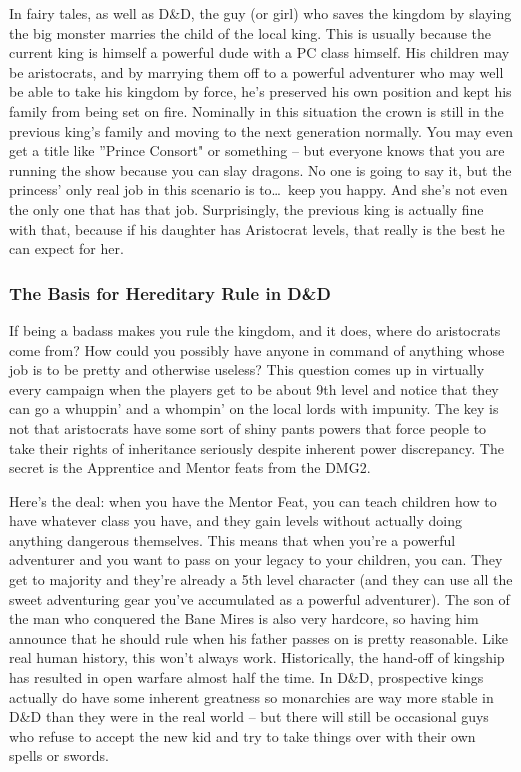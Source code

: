 In fairy tales, as well as D\&D, the guy (or girl) who saves the kingdom by slaying the big monster marries the child of the local king. This is usually because the current king is himself a powerful dude with a PC class himself. His children may be aristocrats, and by marrying them off to a powerful adventurer who may well be able to take his kingdom by force, he's preserved his own position and kept his family from being set on fire. Nominally in this situation the crown is still in the previous king's family and moving to the next generation normally. You may even get a title like ''Prince Consort" or something -- but everyone knows that you are running the show because you can slay dragons. No one is going to say it, but the princess' only real job in this scenario is to\ldots\  keep you happy. And she's not even the only one that has that job. Surprisingly, the previous king is actually fine with that, because if his daughter has Aristocrat levels, that really is the best he can expect for her.

\subsubsection{The Basis for Hereditary Rule in D\&D}
\vspace*{-8pt}

If being a badass makes you rule the kingdom, and it does, where do aristocrats come from? How could you possibly have anyone in command of anything whose job is to be pretty and otherwise useless? This question comes up in virtually every campaign when the players get to be about 9th level and notice that they can go a whuppin' and a whompin' on the local lords with impunity. The key is not that aristocrats have some sort of shiny pants powers that force people to take their rights of inheritance seriously despite inherent power discrepancy. The secret is the Apprentice and Mentor feats from the DMG2.

Here's the deal: when you have the Mentor Feat, you can teach children how to have whatever class you have, and they gain levels without actually doing anything dangerous themselves. This means that when you're a powerful adventurer and you want to pass on your legacy to your children, you can. They get to majority and they're already a 5th level character (and they can use all the sweet adventuring gear you've accumulated as a powerful adventurer). The son of the man who conquered the Bane Mires is also very hardcore, so having him announce that he should rule when his father passes on is pretty reasonable. Like real human history, this won't always work. Historically, the hand-off of kingship has resulted in open warfare almost half the time. In D\&D, prospective kings actually do have some inherent greatness so monarchies are way more stable in D\&D than they were in the real world -- but there will still be occasional guys who refuse to accept the new kid and try to take things over with their own spells or swords.

